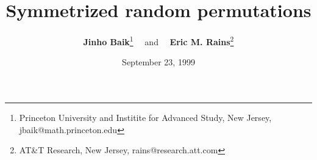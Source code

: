 \documentclass{article}
\theoremstyle{remark}
\theoremstyle{definition}
\numberwithin{equation}{section}
\numberwithin{thm}{section}
\begin{document}
\title{{\bf Symmetrized random permutations}}
\author{{\bf Jinho Baik}\footnote{
Princeton University and Institite for Advanced Study,
New Jersey, jbaik@math.princeton.edu} \ \ 
and \ \ {\bf Eric M. Rains}\footnote{AT\&T Research, New Jersey, 
rains@research.att.com}}

\date{September 23, 1999}
\maketitle

%










\end{document}
